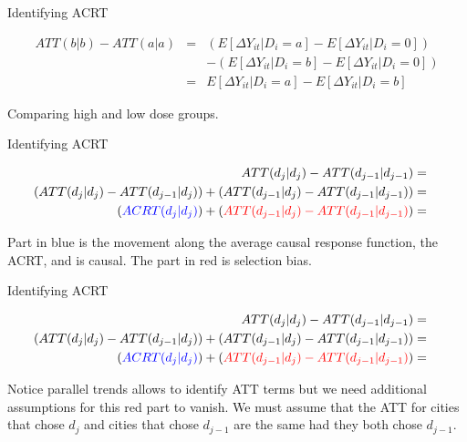 \documentclass{beamer}
\begin{document}
\begin{frame}{Identifying ACRT}


\begin{eqnarray*}
ATT(b|b) - ATT(a|a) &=& ( E[ \Delta Y_{it} | D_i =a ] - E[ \Delta Y_{it} | D_i = 0]) \\
&& - ( E[ \Delta Y_{it} | D_i =b ] - E[ \Delta Y_{it} | D_i = 0]) \\
&=& E [ \Delta Y_{it} | D_i=a] - E[\Delta Y_{it} | D_i=b]
\end{eqnarray*}

Comparing high and low dose groups.

\end{frame}

\begin{frame}{Identifying ACRT}


\begin{eqnarray*}
ATT(d_j|d_j) - ATT(d_{j-1} | d_{j-1}) &=& \\
( ATT(d_j|d_j) - ATT(d_{j-1} | d_{j}) ) + ( ATT(d_{j-1} | d_j) - ATT(d_{j-1} | d_{j-1}) )&=&  \\
 ( \textcolor{blue}{ACRT(d_j | d_j)} ) + ( \textcolor{red}{ATT(d_{j-1} | d_j) - ATT(d_{j-1} | d_{j-1})} )&=&  \\
\end{eqnarray*}

Part in blue is the movement along the average causal response function, the ACRT, and is causal.  The part in red is selection bias. 

\end{frame}

\begin{frame}{Identifying ACRT}


\begin{eqnarray*}
ATT(d_j|d_j) - ATT(d_{j-1} | d_{j-1}) &=& \\
( ATT(d_j|d_j) - ATT(d_{j-1} | d_{j}) ) + ( ATT(d_{j-1} | d_j) - ATT(d_{j-1} | d_{j-1}) )&=&  \\
 ( \textcolor{blue}{ACRT(d_j | d_j)} ) + ( \textcolor{red}{ATT(d_{j-1} | d_j) - ATT(d_{j-1} | d_{j-1})} )&=&  \\
\end{eqnarray*}

Notice parallel trends allows to identify ATT terms but we need additional assumptions for this red part to vanish. We must assume that the ATT for cities that chose $d_j$ and cities that chose $d_{j-1}$ are the same had they both chose $d_{j-1}$.

\end{frame}
\end{document}
